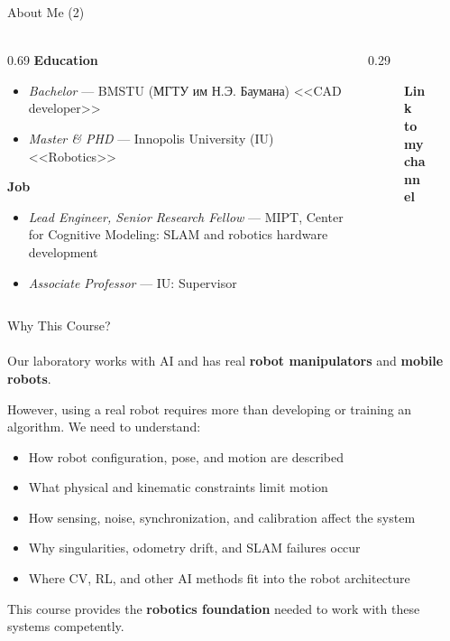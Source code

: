 \documentclass[aspectratio=169]{beamer}
\begin{document}
\begin{frame}[t]{About Me (2)}
    \framesubtitle{}
    \begin{columns}[T,onlytextwidth]
        \begin{column}{0.69\textwidth}
            \textbf{Education}
            \begin{itemize}
                \item \textit{Bachelor} --- BMSTU (МГТУ им Н.Э. Баумана) <<CAD developer>>
                \item \textit{Master \& PHD} --- Innopolis University (IU) <<Robotics>>
            \end{itemize}
            \textbf{Job}
            \begin{itemize}
                \item \textit{Lead Engineer, Senior Research Fellow} --- MIPT, Center for Cognitive Modeling: SLAM and robotics hardware development
                \item \textit{Associate Professor} --- IU: Supervisor
            \end{itemize}
        \end{column}
        \begin{column}{0.29\textwidth}
            \begin{figure}[H]
                \centering
                \caption*{\textbf{Link to my channel}}
                \label{fig:qrcode}
            \end{figure}
        \end{column}
    \end{columns}
\end{frame}

\begin{frame}[t]{Why This Course?}
    \framesubtitle{}
    \vspace*{-0.3cm}
    Our laboratory works with AI and has real
    \textbf{robot manipulators} and \textbf{mobile robots}.

    \medskip

    However, using a real robot requires more than developing
    or training an algorithm. We need to understand:
    \begin{itemize}
        \item How robot configuration, pose, and motion are described
        \item What physical and kinematic constraints limit motion
        \item How sensing, noise, synchronization, and calibration
        affect the system
        \item Why singularities, odometry drift, and SLAM failures occur
        \item Where CV, RL, and other AI methods fit into the robot
        architecture
    \end{itemize}

    \medskip

    This course provides the \textbf{robotics foundation}
    needed to work with these systems competently.
\end{frame}
\end{document}
